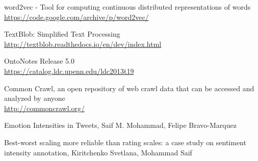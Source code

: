\begin{thebibliography}{9}
word2vec - Tool for computing continuous distributed representations of words
\\\footnotesize \url{https://code.google.com/archive/p/word2vec/}

TextBlob: Simplified Text Processing
\\\footnotesize \url{http://textblob.readthedocs.io/en/dev/index.html}

OntoNotes Release 5.0
\\\footnotesize \url{https://catalog.ldc.upenn.edu/ldc2013t19}

Common Crawl, an open repository of web crawl data that can be accessed and analyzed by anyone
\\\footnotesize \url{http://commoncrawl.org/}

Emotion Intensities in Tweets, Saif M. Mohammad, Felipe Bravo-Marquez

Best-worst scaling more reliable than rating scales: a case study on
sentiment intensity annotation, Kiritchenko Svetlana, Mohammad Saif

\end{thebibliography}
 


              
